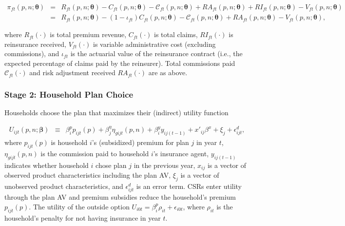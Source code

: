 \documentclass[12pt]{article}
\begin{document}
\vspace{-0.4in}		
\begin{footnotesize}
\begin{eqnarray}
\label{eqn:profit}
	\pi_{ft}(\textit{p},\textit{n};\boldsymbol{\theta}) &=&  R_{ft}(\textit{p},\textit{n};\boldsymbol{\theta}) -  C_{ft}(\textit{p},\textit{n};\boldsymbol{\theta}) - \mathcal{C}_{ft}(\textit{p},\textit{n};\boldsymbol{\theta}) + RA_{ft}(\textit{p},\textit{n};\boldsymbol{\theta}) +  RI_{ft}(\textit{p},\textit{n};\boldsymbol{\theta})  - V_{ft}(\textit{p},\textit{n};\boldsymbol{\theta})  \nonumber \\
	&=& R_{ft}(\textit{p},\textit{n};\boldsymbol{\theta}) - (1 - \iota_{ft}) C_{ft}(\textit{p},\textit{n};\boldsymbol{\theta}) - \mathcal{C}_{ft}(\textit{p},\textit{n};\boldsymbol{\theta}) + RA_{ft}(\textit{p},\textit{n};\boldsymbol{\theta})   - V_{ft}(\textit{p},\textit{n};\boldsymbol{\theta}),
\end{eqnarray}
\end{footnotesize}

\noindent where $R_{ft}(\cdot)$ is total premium revenue, $C_{ft}(\cdot)$ is total claims, $RI_{ft}(\cdot)$ is reinsurance received, $V_{ft}(\cdot)$  is variable administrative cost (excluding commissions), and $\iota_{ft}$ is the actuarial value of the reinsurance contract (i.e., the expected percentage of claims paid by the reinsurer).  Total commissions paid $\mathcal{C}_{ft}(\cdot)$ and risk adjustment received  $RA_{ft}(\cdot)$ are as above.


\subsubsection{Stage 2: Household Plan Choice}
Households choose the plan that maximizes their (indirect) utility function

\vspace{-0.4in}
\begin{eqnarray}
\label{eqn:demand_model}
	U_{ijt}(\textit{p},\textit{n};\boldsymbol{\beta}) &\equiv& \beta_{i}^p p_{ijt}(\textit{p}) + \beta_j^{\eta} \eta_{gijt}(\textit{p},\textit{n})   + \beta_i^y y_{ij(t-1)} + x'_{ij}\beta^x + \xi_{j} + \epsilon_{ijt}^d, 
\end{eqnarray}
where $p_{ijt}(\textit{p})$ is household $i$'s (subsidized) premium for plan $j$ in year $t$, $\eta_{gijt}(\textit{p},\textit{n})$ is the commission paid to household $i$'s insurance agent, $y_{ij(t-1)}$ indicates whether household $i$ chose plan $j$ in the previous year, $x_{ij}$ is a vector of observed product characteristics including the plan AV,  $\xi_{j}$ is a vector of unobserved product characteristics, and $\epsilon_{ijt}^d$ is an error term.  CSRs enter utility through the plan AV and premium subsidies reduce the household's premium $p_{ijt}(\textit{p})$.   The utility of the outside option $U_{i0t} = \beta_i^p \rho_{it} + \epsilon_{i0t}$, where $\rho_{it}$ is the household's penalty for not having insurance in year $t$. 
\end{document}
